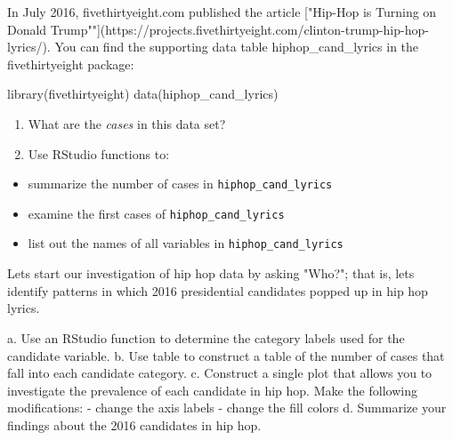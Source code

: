 \documentclass[
  letterpaper,
  DIV=11,
  numbers=noendperiod]{scrreprt}
\newenvironment{Shaded}{\begin{snugshade}}{\end{snugshade}}
\newcommand{\FunctionTok}[1]{\textcolor[rgb]{0.28,0.35,0.67}{#1}}
\newcommand{\NormalTok}[1]{\textcolor[rgb]{0.00,0.23,0.31}{#1}}
\providecommand{\tightlist}{%
  \setlength{\itemsep}{0pt}\setlength{\parskip}{0pt}}\usepackage{longtable,booktabs,array}
\begin{document}

\begin{Shaded}
\begin{Highlighting}[]
\NormalTok{In July 2016, fivethirtyeight.com published the article ["Hip{-}Hop is Turning on Donald Trump""](https://projects.fivethirtyeight.com/clinton{-}trump{-}hip{-}hop{-}lyrics/).  You can find the supporting data table \textasciigrave{}hiphop\_cand\_lyrics\textasciigrave{} in the \textasciigrave{}fivethirtyeight\textasciigrave{} package:    }
  
\end{Highlighting}
\end{Shaded}

\begin{Shaded}
\begin{Highlighting}[]
\FunctionTok{library}\NormalTok{(fivethirtyeight)}
\FunctionTok{data}\NormalTok{(hiphop\_cand\_lyrics)}
\end{Highlighting}
\end{Shaded}

\begin{enumerate}
\def\labelenumi{\alph{enumi}.}
\tightlist
\item
  What are the \emph{cases} in this data set?\\
\item
  Use RStudio functions to:\\
\end{enumerate}

\begin{itemize}
\tightlist
\item
  summarize the number of cases in \texttt{hiphop\_cand\_lyrics}\\
\item
  examine the first cases of \texttt{hiphop\_cand\_lyrics}\\
\item
  list out the names of all variables in \texttt{hiphop\_cand\_lyrics}
\end{itemize}

\begin{Shaded}
\begin{Highlighting}[]
\NormalTok{Let\textquotesingle{}s start our investigation of hip hop data by asking "Who?"; that is, let\textquotesingle{}s identify patterns in which 2016 presidential candidates popped up in hip hop lyrics.    }
  
\NormalTok{  a. Use an RStudio function to determine the category labels used for the \textasciigrave{}candidate\textasciigrave{} variable.    }
\NormalTok{  b. Use \textasciigrave{}table\textasciigrave{} to construct a table of the number of cases that fall into each \textasciigrave{}candidate\textasciigrave{} category.    }
\NormalTok{  c. Construct a single plot that allows you to investigate the prevalence of each candidate in hip hop.  Make the following modifications:    }
\NormalTok{    {-} change the axis labels    }
\NormalTok{    {-} change the fill colors    }
\NormalTok{  d. Summarize your findings about the 2016 candidates in hip hop.}
        
\end{Highlighting}
\end{Shaded}
\end{document}
